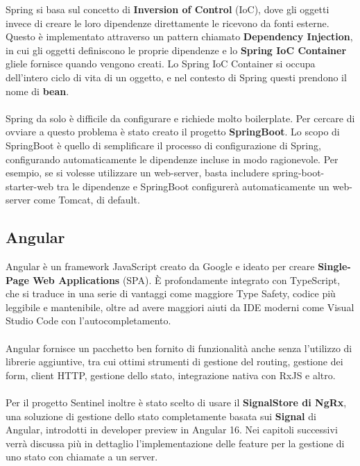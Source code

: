 Spring si basa sul concetto di \textbf{Inversion of Control} (IoC), dove gli oggetti invece di creare le loro dipendenze direttamente le ricevono da fonti esterne.
Questo \`e implementato attraverso un pattern chiamato \textbf{Dependency Injection}, in cui gli oggetti definiscono le proprie dipendenze e lo \textbf{Spring IoC Container}
gliele fornisce quando vengono creati.
Lo Spring IoC Container si occupa dell'intero ciclo di vita di un oggetto, e nel contesto di Spring questi prendono il nome di \textbf{bean}.
\\\\
Spring da solo \`e difficile da configurare e richiede molto boilerplate. Per cercare di ovviare a questo problema \`e stato creato il progetto \textbf{SpringBoot}.
Lo scopo di SpringBoot \`e quello di semplificare il processo di configurazione di Spring, configurando automaticamente le dipendenze incluse in modo ragionevole.
Per esempio, se si volesse utilizzare un web-server, basta includere spring-boot-starter-web tra le dipendenze e SpringBoot configurer\`a automaticamente un web-server come Tomcat, di default.
\subsection{Angular}
Angular \`e un framework JavaScript creato da Google e ideato per creare \textbf{Single-Page Web Applications} (SPA). \`E profondamente integrato con TypeScript,
che si traduce in una serie di vantaggi come maggiore Type Safety, codice pi\`u leggibile e mantenibile, oltre ad avere maggiori aiuti da IDE moderni come Visual Studio Code
con l'autocompletamento.
\\\\
Angular fornisce un pacchetto ben fornito di funzionalit\`a anche senza l'utilizzo di librerie aggiuntive, tra cui ottimi strumenti di gestione del
routing, gestione dei form, client HTTP, gestione dello stato, integrazione nativa con RxJS e altro.
\\\\
Per il progetto Sentinel inoltre \`e stato scelto di usare il \textbf{SignalStore di NgRx}, una soluzione di gestione dello stato completamente basata sui \textbf{Signal} di Angular,
introdotti in developer preview in Angular 16. Nei capitoli successivi verr\`a discussa pi\`u in dettaglio l'implementazione delle feature per la gestione di uno stato
con chiamate a un server.
